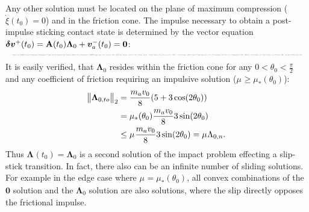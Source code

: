 \documentclass[global,twocolumn]{svjour}
\let\vec\bm
\newcommand{\vectoscalar}[1]{{\renewcommand{\vec}{}#1}}
\newcommand{\mat}[1]{{\bf #1}}
\newcommand{\transp}{{\mathrm{T}}}
\newcommand{\prelinvel} [1]{\ensuremath{\vec{v}_{#1}^-}}
\newcommand{\mass}   [1]{\ensuremath{m_{#1}}}
\newcommand{\cof}[1]{\ensuremath{\mu_{#1}}}
\newcommand{\contactimpulse}[1]{\ensuremath{\vec{\Lambda}_{#1}}}
\newcommand{\contactimpulseCFn}[1]{\ensuremath{\vectoscalar{\contactimpulse{\ifstrequal{#1}{}{n}{#1,n}}}}}
\newcommand{\contactimpulseCFto}[1]{\ensuremath{\contactimpulse{\ifstrequal{#1}{}{to}{#1,to}}}}
\newcommand{\postrelvel}[1]{\ensuremath{{\vec{\delta v}_{#1}^+}}}
\newcommand{\shrinkeqnnew}[2]{\resizebox{#1\linewidth}{!}{\begin{varwidth}[t]{2\linewidth}\ensuremath{\displaystyle{#2}}\end{varwidth}}}
\begin{document}
	Any other solution must be located on the plane of maximum compression
	($\dot{\xi}(t_0) = 0$) and in the friction cone.
	The impulse necessary to obtain a post-impulse sticking contact state is
	determined by the vector equation 
	$\postrelvel{}(t_0) = \mat{A}(t_0) \contactimpulse{0} + \prelinvel{a}(t_0) = \vec 0$:
	\begin{equation*}
		\shrinkeqnnew{1}{
		\begin{split}
			\contactimpulse{0} & = \frac{\mass{a}}{8} \begin{bmatrix} 5 + 3\cos(2 \theta_0) & 3 \sin(2\theta_0) & 0 \\ 3 \sin(2\theta_0) & 5 - 3 \cos(2 \theta_0) & 0 \\ 0 & 0 & \frac{16}{5 + 3 \cos(4 \theta_0)}\end{bmatrix} \begin{pmatrix} v_0 \\ 0 \\ 0 \end{pmatrix} = \\
			                   & = \frac{\mass{a} v_0}{8} (5 + 3\cos(2\theta_0), 3 \sin (2 \theta_0), 0)^\transp.
		\end{split}
		}
	\end{equation*}
	It is easily verified, that $\contactimpulse{0}$ resides within the
	friction cone for any $0 < \theta_0 < \frac{\pi}{2}$ and any
	coefficient of friction requiring an impulsive solution ($\cof{} \geq \cof{*}(\theta_0)$):
	\begin{equation*}
		\begin{split}
			\norm{\contactimpulseCFto{0}}_2 & = \frac{\mass{a} v_0}{8} (5 + 3\cos (2 \theta_0)) \\
			                                & = \cof{*}(\theta_0) \frac{\mass{a} v_0}{8} 3 \sin(2\theta_0) \\
			                                & \leq \cof{} \frac{\mass{a} v_0}{8} 3 \sin(2\theta_0) = \cof{} \contactimpulseCFn{0}.
		\end{split}
	\end{equation*}
	Thus $\contactimpulse{}(t_0) = \contactimpulse{0}$ is a second solution
	of the impact problem effecting a slip-stick transition. In fact,
	there also can be an infinite number of sliding solutions. For example in
	the edge case where $\cof{} = \cof{*}(\theta_0)$, all convex combinations
	of the $\vec 0$ solution and the $\contactimpulse{0}$ solution are
	also solutions, where the slip directly opposes the frictional impulse.
\end{document}
